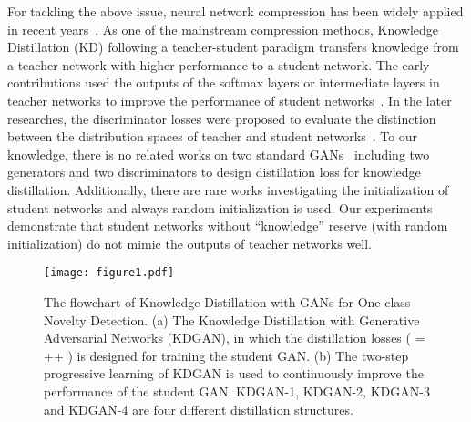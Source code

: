 \documentclass{article}
\begin{document}
	For tackling the above issue, neural network compression has been widely applied in recent years~\cite{survey:2017}. As one of the mainstream compression methods, Knowledge Distillation (KD) following a teacher-student paradigm transfers knowledge from a teacher network with higher performance to a student network. The early contributions used the outputs of the softmax layers or intermediate layers in teacher networks to improve the performance of student networks~\cite{Hinton:2015,Fitnets:2015}. In the later researches, the discriminator losses were proposed to evaluate the distinction between the distribution spaces of teacher and student networks~\cite{KDGAN:2018,Portable:2018,KTAN:2018}. To our knowledge, there is no related works on two standard GANs~\cite{GAN:2014} including two generators and two discriminators to design distillation loss for knowledge distillation. Additionally, there are rare works investigating the initialization of student networks and always random initialization is used. Our experiments demonstrate that student networks without ``knowledge'' reserve (with random initialization) do not mimic the outputs of teacher networks well. 
	
	\begin{figure*}
		\centering
		\texttt{[image: figure1.pdf]}
		\caption{The flowchart of Knowledge Distillation with GANs for One-class Novelty Detection. (a) The Knowledge Distillation with Generative Adversarial Networks (KDGAN), in which the distillation losses  ( =  ++ ) is designed for training the student GAN. (b) The two-step progressive learning of KDGAN is used to continuously improve the performance of the student GAN. KDGAN-\normalsize{\textcircled{\footnotesize{1}}}, KDGAN-\normalsize{\textcircled{\footnotesize{2}}}, KDGAN-\normalsize{\textcircled{\footnotesize{3}}} and KDGAN-\normalsize{\textcircled{\footnotesize{4}}} are four different distillation structures.}\label{fig:P-KDGAN}
	\end{figure*}
	
\end{document}
